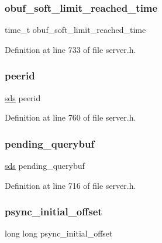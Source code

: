 \subsubsection{\texorpdfstring{obuf\+\_\+soft\+\_\+limit\+\_\+reached\+\_\+time}{obuf\_soft\_limit\_reached\_time}}
{\footnotesize\ttfamily time\+\_\+t obuf\+\_\+soft\+\_\+limit\+\_\+reached\+\_\+time}



Definition at line 733 of file server.\+h.

\mbox{\label{structclient_a1c0771287014c17317f1d2536fea4427}} 
\subsubsection{\texorpdfstring{peerid}{peerid}}
{\footnotesize\ttfamily \hyperlink{sds_8h_ad69abac3df4532879db9642c95f5ef6f}{sds} peerid}



Definition at line 760 of file server.\+h.

\mbox{\label{structclient_ae41c09e14760e794d4378519d312ba9a}} 
\subsubsection{\texorpdfstring{pending\+\_\+querybuf}{pending\_querybuf}}
{\footnotesize\ttfamily \hyperlink{sds_8h_ad69abac3df4532879db9642c95f5ef6f}{sds} pending\+\_\+querybuf}



Definition at line 716 of file server.\+h.

\mbox{\label{structclient_a52806966ab7367bd568472363fe749d3}} 
\subsubsection{\texorpdfstring{psync\+\_\+initial\+\_\+offset}{psync\_initial\_offset}}
{\footnotesize\ttfamily long long psync\+\_\+initial\+\_\+offset}



